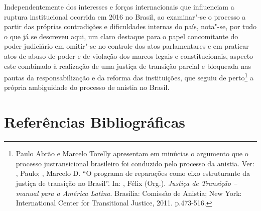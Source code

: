 Independentemente dos interesses e forças internacionais que influenciam
a ruptura institucional ocorrida em 2016 no Brasil, ao examinar"-se o
processo a partir das próprias contradições e dificuldades internas do
país, nota"-se, por tudo o que já se descreveu aqui, um claro destaque
para o papel concomitante do poder judiciário em omitir"-se no controle
dos atos parlamentares e em praticar atos de abuso de poder e de
violação dos marcos legais e constitucionais, aspecto este combinado à
realização de uma justiça de transição parcial e bloqueada nas pautas da
responsabilização e da reforma das instituições, que seguiu de
perto\footnote{Paulo Abrão e Marcelo Torelly apresentam em minúcias o
  argumento que o processo justransicional brasileiro foi conduzido pelo
  processo da anistia. Ver: , Paulo; , Marcelo D.
  ``O programa
  de reparações como eixo estruturante da justiça de transição no
  Brasil''. In: , Félix (Org.). \emph{Justiça de Transição --
  manual para a América Latina}. Brasília: Comissão de Anistia; New York:
  International Center for Transitional Justice, 2011. p.473-516.} a
própria ambiguidade do processo de anistia no Brasil.

\section{Referências Bibliográficas}

